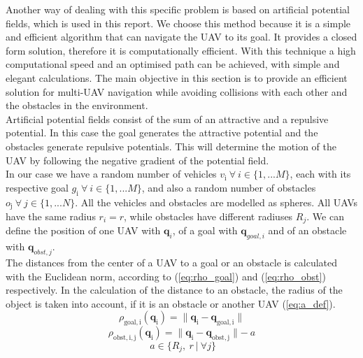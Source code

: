 \documentclass[journal]{IEEEtran}
\newcommand*{\subb}[1]{_{\mathrm{#1}}}
\begin{document}
		Another way of dealing with this specific problem is based on artificial potential fields, which is used in this report. We choose this method because it is a simple and efficient algorithm that can navigate the UAV to its goal. It provides a closed form solution, therefore it is computationally efficient. With this technique a high computational speed and an optimised path can be achieved, with simple and elegant calculations\cite{Ge2002}. The main objective in this section is to provide an efficient solution for multi-UAV navigation while avoiding collisions with each other and the obstacles in the environment.\\
		
		Artificial potential fields consist of the sum of an attractive and a repulsive potential. In this case the goal generates the attractive potential and the obstacles generate repulsive potentials. This will determine the motion of the UAV by following the negative gradient of the potential field. \\
		
		In our case we have a random number of vehicles $v\subb{i} \ \forall \ i \in \{1, ...M\}$, each with its respective goal $g\subb{i} \ \forall \ i \in \{1, ...M\}$, and also a random number of obstacles $o\subb{j} \ \forall \ j \in \{1, ...N\}$. All the vehicles and obstacles are modelled as spheres. All UAVs have the same radius $r_i = r$, while obstacles have different radiuses $R_j$. We can define the position of one UAV with $\bm{q}_i $, of a goal with $\bm{q}_{goal,i}$ and of an obstacle with $\bm{q}_{obst,j} $.\\
		
		The distances from the center of a UAV to a goal or an obstacle is calculated with the Euclidean norm, according to (\ref{eq:rho_goal}) and (\ref{eq:rho_obst}) respectively. In the calculation of the distance to an obstacle, the radius of the object is taken into account, if it is an obstacle or another UAV (\ref{eq:a_def}).
		\begin{equation} \label{eq:rho_goal}
		\rho\subb{goal, i}(\bm{q}\subb{i}) = \parallel \bm{q}\subb{i} - \bm{q}\subb{goal,i}\parallel
		\end{equation}
		\begin{equation} \label{eq:rho_obst}
		\rho\subb{obst, i, j}(\bm{q}\subb{i}) = \parallel \bm{q}\subb{i} - \bm{q}\subb{obst, j}\parallel - \ a
		\end{equation}
		\begin{equation} \label{eq:a_def}
		\ a \in \{R_j, \ r\ |\ \forall j\}
		\end{equation}
		
\end{document}
